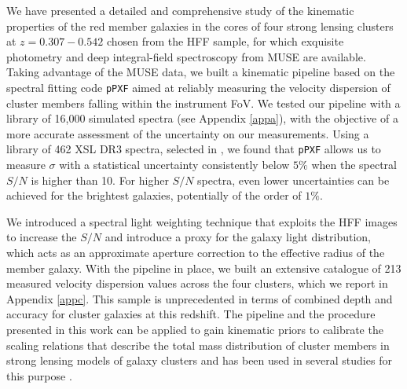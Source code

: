 \documentclass{aa}
\begin{document}
We have presented a detailed and comprehensive study of the kinematic properties of the red member galaxies in the cores of four strong lensing clusters at $z = 0.307-0.542$ chosen from the HFF sample, for which exquisite photometry and deep integral-field spectroscopy from MUSE are available. Taking advantage of the MUSE data, we built a kinematic pipeline based on the spectral fitting code \texttt{pPXF} aimed at reliably measuring the velocity dispersion of cluster members falling within the instrument FoV. We tested our pipeline with a library of 16,000 simulated spectra (see Appendix \ref{appa}), with the objective of a more accurate assessment of the uncertainty on our measurements. Using a library of 462 XSL DR3 spectra, selected in \citet{knabel25}, we found that \texttt{pPXF} allows us to measure $\sigma$ with a statistical uncertainty consistently below $5\%$ when the spectral $S/N$ is higher than 10. For higher $S/N$ spectra, even lower uncertainties can be achieved for the brightest galaxies, potentially of the order of $1\%$.

We introduced a spectral light weighting technique that exploits the HFF images to increase the $S/N$ and introduce a proxy for the galaxy light distribution, which acts as an approximate aperture correction to the effective radius of the member galaxy. With the pipeline in place, we built an extensive catalogue of 213 measured velocity dispersion values across the four clusters, which we report in Appendix \ref{appc}. This sample is unprecedented in terms of combined depth and accuracy for cluster galaxies at this redshift. The pipeline and the procedure presented in this work can be applied to gain kinematic priors to calibrate the scaling relations that describe the total mass distribution of cluster members in strong lensing models of galaxy clusters and has been used in several studies for this purpose \citep[][Bianchetti et al. in prep.]{bolamperti24,granata25,ertl25,acebron25,abriola25}.
\end{document}
